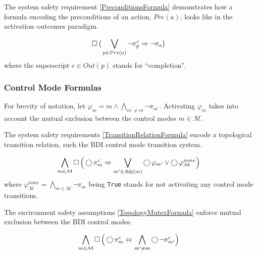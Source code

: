 The system safety requirement \eqref{PreconditionsFormula} demonstrates how a formula encoding the preconditions of an action, $Pre(a)$, looks like in the activation--outcomes paradigm.

\begin{equation}\label{PreconditionsFormula}
	\operatorname{\Box} \big( \bigvee \limits_{p \in Pre(a)} \lnot \pi_p^c \Rightarrow \lnot \pi_a \big)
\end{equation}
where the superscript $c \in Out(p)$ stands for ``completion".


\subsubsection{Control Mode Formulas}

For brevity of notation, let $\varphi_m = m \wedge \bigwedge_{m^\prime \neq m} \lnot \pi_{m^\prime}$.
Activating $\varphi_m$ takes into account the mutual exclusion between the control modes $m \in \mathcal{M}$.

The system safety requirements \eqref{TransitionRelationFormula} encode a topological transition relation, such the BDI control mode transition system.

\begin{equation}\label{TransitionRelationFormula}
	\bigwedge \limits_{m \in \mathcal{M}} \operatorname{\Box} \Big( \operatorname{\bigcirc} \pi_m^c \Rightarrow \bigvee \limits_{m^\prime \in Adj(m)} \operatorname{\bigcirc} \varphi_{m^\prime} \vee \operatorname{\bigcirc} \varphi_\mathcal{M}^{none} \Big)
\end{equation}
where $\varphi_\mathcal{M}^{none} = \bigwedge_{m \in \mathcal{M}} \lnot \pi_m$ being \texttt{True} stands for not activating any control mode transitions.

The environment safety assumptions \eqref{TopologyMutexFormula} enforce mutual exclusion between the BDI control modes.

\begin{equation}\label{TopologyMutexFormula}
	\bigwedge \limits_{m \in \mathcal{M}} \operatorname{\Box} \Big( \operatorname{\bigcirc} \pi_m^c \Leftrightarrow \bigwedge \limits_{m^\prime \neq m} \operatorname{\bigcirc} \lnot \pi_{m^\prime}^c \Big)
\end{equation}

